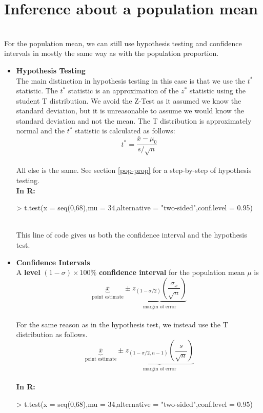 \documentclass{article}
\begin{document}
\section{Inference about a population mean}
  \\ For the population mean, we can still use hypothesis testing and confidence intervals in mostly the same way as with the population proportion.
  \begin{itemize}
    \item \textbf{Hypothesis Testing}
    \\ The main distinction in hypothesis testing in this case is that we use the $t^*$ statistic. The $t^*$ statistic is an approximation of the $z^*$ statistic using the student T distribution. We avoid the Z-Test as it assumed we know the standard deviation, but it is unreasonable to assume we would know the standard deviation and not the mean. The T distribution is approximately normal and the $t^*$ statistic is calculated as follows:
    $$t^* = \frac{\bar{x}-\mu_0}{s/\sqrt{n}}$$
    \\ All else is the same. See section \ref{pop-prop} for a step-by-step of hypothesis testing.
    \\ \textbf{In R:}
\begin{Schunk}
\begin{Sinput}
> t.test(x = seq(0,68),mu = 34,alternative = "two-sided",conf.level = 0.95)
\end{Sinput}
\end{Schunk}
\\ This line of code gives us both the confidence interval and the hypothesis test.
    \item \textbf{Confidence Intervals}
    \\ A \textbf{level} $(1-\sigma)\times 100\%$ \textbf{confidence interval} for the population mean $\mu$ is
    $$\underbrace{\bar{x}}_\text{point estimate}\pm \underbrace{z_{(1-\sigma /2)}(\frac{\sigma_x}{\sqrt{n}})}_\text{margin of error}$$
    \\ For the same reason as in the hypothesis test, we instead use the T distribution as follows.
    $$\underbrace{\bar{x}}_\text{point estimate}\pm \underbrace{z_{(1-\sigma /2,n-1)}(\frac{s}{\sqrt{n}})}_\text{margin of error}$$
    \\ \textbf{In R:}
\begin{Schunk}
\begin{Sinput}
> t.test(x = seq(0,68),mu = 34,alternative = "two-sided",conf.level = 0.95)
\end{Sinput}
\end{Schunk}
  \end{itemize}
\end{document}
